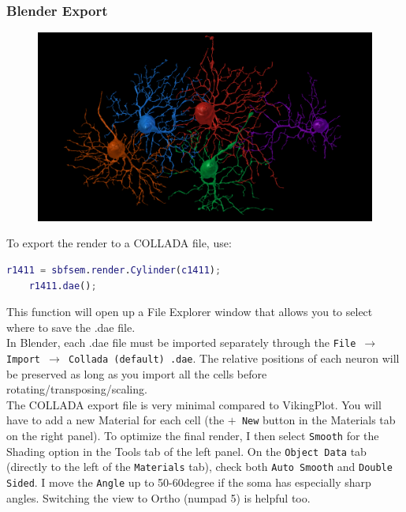 \documentclass[12pt]{exam}
\begin{document}
	\subsubsection{Blender Export}
	\begin{figure}
		\includegraphics[width=\linewidth]{parasolRGCs}
		\label{blenderParasol}
	\end{figure}
	To export the render to a COLLADA file, use:
	\begin{lstlisting}[language=matlab]
	r1411 = sbfsem.render.Cylinder(c1411);
	r1411.dae();\end{lstlisting}
	This function will open up a File Explorer window that allows you to select where to save the .dae file.\\

	In Blender, each .dae file must be imported separately through the \texttt{File $\rightarrow$ Import $\rightarrow$ Collada (default) .dae}. The relative positions of each neuron will be preserved as long as you import all the cells before rotating/transposing/scaling.\\
	The COLLADA export file is very minimal compared to VikingPlot. You will have to add a new Material for each cell (the \texttt{$+$ New} button in the Materials tab on the right panel). To optimize the final render, I then select \texttt{Smooth} for the Shading option in the Tools tab of the left panel. On the \texttt{Object Data} tab (directly to the left of the \texttt{Materials} tab), check both \texttt{Auto Smooth} and \texttt{Double Sided}. I move the \texttt{Angle} up to 50-60\si{degree} if the soma has especially sharp angles. Switching the view to Ortho (numpad 5) is helpful too.
\end{document}
